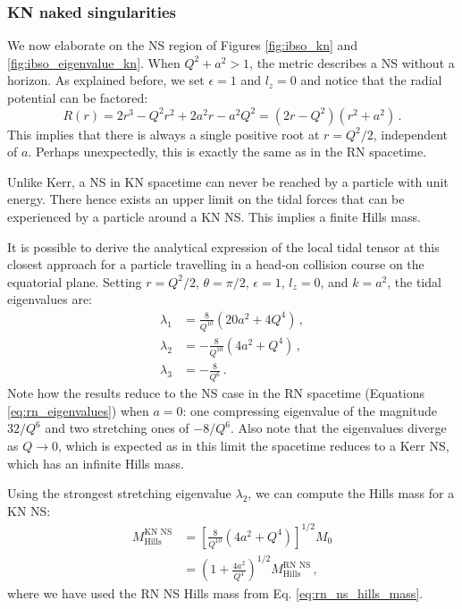 \documentclass[
    reprint,
    prd,
    nofootinbib,
    amsmath,amssymb,
    aps,
    floatfix,
]{revtex4-2}
\begin{document}
\subsubsection{KN naked singularities}


We now elaborate on the NS region of Figures \ref{fig:ibso_kn} and \ref{fig:ibso_eigenvalue_kn}. When $Q^{2} + a^{2} > 1$, the metric describes a NS without a horizon. As explained before, we set $\epsilon = 1$ and $l_{z} = 0$ and notice that the radial potential can be factored:
\begin{equation}
    R(r) = 2 r^{3} - Q^{2} r^{2} + 2 a^{2} r - a^{2} Q^{2} = (2r - Q^{2}) (r^{2} + a^{2}) \, .
\end{equation}
This implies that there is always a single positive root at $r = Q^{2}/2$, independent of $a$. Perhaps unexpectedly, this is exactly the same as in the RN spacetime.

Unlike Kerr, a NS in KN spacetime can never be reached by a particle with unit energy. There hence exists an upper limit on the tidal forces that can be experienced by a particle around a KN NS. This implies a finite Hills mass.

It is possible to derive the analytical expression of the local tidal tensor at this closest approach for a particle travelling in a head-on collision course on the equatorial plane. Setting $r = Q^{2}/2$, $\theta = \pi/2$, $\epsilon = 1$, $l_{z} = 0$, and $k = a^{2}$, the tidal eigenvalues are:
\begin{equation}
    \begin{split}
        \lambda_{1} &= \frac{8}{Q^{10}} (20a^{2} + 4Q^{4}) \, , \\
        \lambda_{2} &= -\frac{8}{Q^{10}} (4a^{2} + Q^{4}) \, , \\
        \lambda_{3} &= -\frac{8}{Q^{6}} \, .
    \end{split}
\end{equation}
Note how the results reduce to the NS case in the RN spacetime (Equations \ref{eq:rn_eigenvalues}) when $a = 0$: one compressing eigenvalue of the magnitude $32/Q^{6}$ and two stretching ones of $-8/Q^{6}$. Also note that the eigenvalues diverge as $Q \to 0$, which is expected as in this limit the spacetime reduces to a Kerr NS, which has an infinite Hills mass.

Using the strongest stretching eigenvalue $\lambda_{2}$, we can compute the Hills mass for a KN NS:
\begin{equation}
\begin{split}
    M_{\text{Hills}}^{\text{KN NS}} &= \left[ \frac{8}{Q^{10}} (4a^{2} + Q^{4}) \right]^{1/2} M_{0} \\
    &= \left( 1 + \frac{4 a^{2}}{Q^{4}} \right)^{1/2} M_{\text{Hills}}^{\text{RN NS}} \, ,
\end{split}
\end{equation}
where we have used the RN NS Hills mass from Eq. \ref{eq:rn_ns_hills_mass}.
\end{document}
